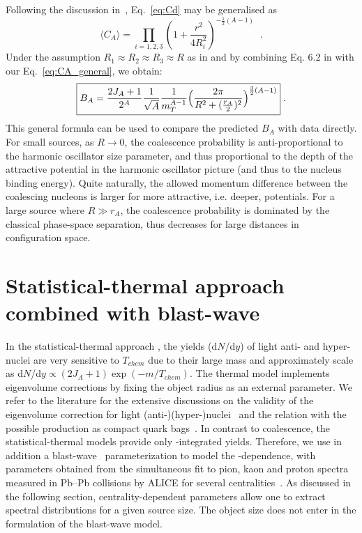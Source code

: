 \documentclass[%
 reprint,
 amsmath,amssymb,
 aps,
]{revtex4-1}
\begin{document}
Following the discussion in~\cite{Scheibl:1998tk, Blum:2017qnn}, Eq.~\ref{eq:Cd} may be generalised as 
%
\begin{equation}
\langle C_{A} \rangle = \prod_{i=1,2,3} \left(1 + \frac{r^2}{4R_{i}^2} \right)^{-\frac{1}{2}(A-1)} \;\; .
\label{eq:CA_general}
\end{equation}
%
Under the assumption $R_1\approx R_2 \approx R_3 \approx R$ as in \cite{Blum:2017qnn} and by combining Eq. 6.2 in \cite{Scheibl:1998tk} with our Eq.~\ref{eq:CA_general}, 
we obtain:
%
\begin{equation}\label{eq:master}
	\boxed {  B_{A} = {2J_{A} + 1 \over 2^{A}} {1 \over \sqrt{A}} {1 \over m_{T}^{A-1}} \Bigl({2\pi \over R^2 + ({r_A \over 2})^2 }\Bigr)^{\frac{3}{2}(A-1)} } \;.
\end{equation}
%
This general formula can be used to compare the predicted $B_{A}$ with data directly.
For small sources, as $R \rightarrow 0$, the coalescence probability is anti-proportional to the harmonic oscillator size parameter, and thus proportional to the depth of the attractive potential in the harmonic oscillator picture (and thus to the nucleus binding energy).
Quite naturally, the allowed momentum difference between the coalescing nucleons is larger for more attractive, i.e. deeper, potentials. 
For a large source where $R \gg r_A$, the coalescence probability is dominated by the classical phase-space separation, thus decreases for large distances in configuration space. 
%

\section{Statistical-thermal approach combined with blast-wave}\label{sec:thermal}
In the statistical-thermal approach \cite{Petran:2013dva,Wheaton:2004qb,Andronic:2005yp}, the yields (d$N$/d$y$) of light anti- and hyper-nuclei are very sensitive to $T_{chem}$ due to their large mass and approximately scale as d$N$/d$y \propto (2J_{A} + 1)\exp(-m/T_{chem})$. 
The thermal model implements eigenvolume corrections by fixing the object radius as an external parameter.
We refer to the literature for the extensive discussions on the validity of the eigenvolume correction for light \mbox{(anti-)(hyper-)}nuclei~\cite{Vovchenko:2016mwg} and the relation with the possible production as compact quark bags~\cite{Andronic:2017}.
In contrast to coalescence, the statistical-thermal models provide only \pt-integrated yields. 
Therefore, we use in addition a blast-wave~\cite{Schnedermann:1993ws} parameterization to model the \pt-dependence, with parameters obtained from the simultaneous fit to pion, kaon and proton spectra measured in Pb--Pb collisions by ALICE for several centralities~\cite{Abelev:2013vea}.  
 As discussed in the following section, centrality-dependent parameters allow one to extract spectral distributions for a given source size. 
The object size does not enter in the formulation of the blast-wave model.
\end{document}
